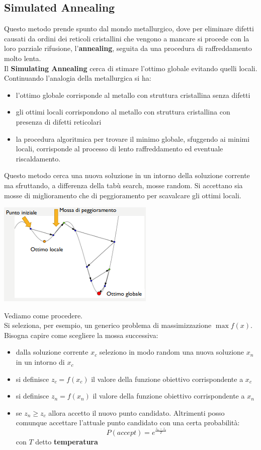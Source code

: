 \documentclass[a4paper,12pt, oneside]{book}
\begin{document}
\subsection{Simulated Annealing}
Questo metodo prende spunto dal mondo metallurgico, dove per eliminare
difetti causati da ordini dei reticoli cristallini che vengono a
mancare si procede con la loro parziale rifusione,
l'\textbf{annealing}, seguita da una procedura di raffreddamento molto
lenta.  \\
Il \textbf{Simulating Annealing} cerca di stimare l'ottimo globale
evitando quelli locali. Continuando l'analogia della metallurgica si
ha:
\begin{itemize}
  \item l’ottimo globale corrisponde al metallo con struttura
  cristallina senza difetti  
  \item gli ottimi locali corrispondono al metallo con struttura
  cristallina con presenza di difetti reticolari
  \item la procedura algoritmica per trovare il minimo globale,
  sfuggendo ai minimi locali, corrisponde al processo di lento
  raffreddamento ed eventuale riscaldamento. 
\end{itemize}
Questo metodo cerca una nuova soluzione in un intorno della soluzione
corrente ma sfruttando, a differenza della tabù search, mosse
random. Si accettano sia mosse di miglioramento che di peggioramento
per scavalcare gli ottimi locali.
\begin{center}
  \includegraphics[scale = 0.8]{img/sa.png}
\end{center}
Vediamo come procedere.\\
Si seleziona, per esempio, un generico problema di massimizzazione
$\max f(x)$. Bisogna capire come scegliere la mossa successiva:
\begin{itemize}
  \item dalla soluzione corrente $x_c$ seleziono in modo random una
  nuova soluzione $x_n$ in un intorno di $x_c$
  \item si definisce $z_c=f(x_c)$ il valore della funzione obiettivo
  corrispondente a $x_c$
  \item si definisce $z_n=f(x_n)$ il valore della funzione obiettivo
  corrispondente a $x_n$
  \item se $z_n\geq z_c$ allora accetto il nuovo punto candidato.
  Altrimenti posso comunque accettare l’attuale punto candidato con
  una certa probabilità:
  \[P(accept)=e^{\frac{z_n-z_c}{T}}\]
  con $T$ detto \textbf{temperatura}
\end{itemize}
\end{document}
